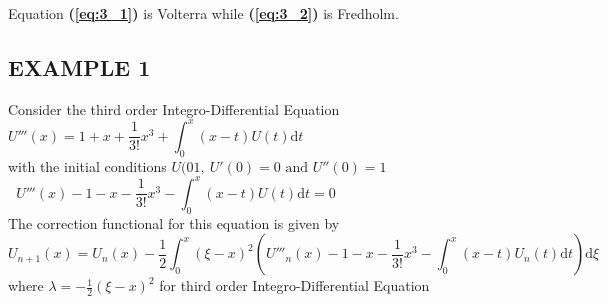 \documentclass[12pt]{report}
\newcommand{\refn}[1]{\textbf{(\ref{#1})}}
\newcommand{\NI}{\noindent}
\newcommand{\dsp}{\displaystyle}
\newcommand{\IDE}{Integro-Differential Equation}
\begin{document}
	\NI Equation \refn{eq:3_1} is Volterra while \refn{eq:3_2} is Fredholm.
	
	\subsection{EXAMPLE 1}
	Consider the third order \IDE 
	\begin{equation*}
		U'''(x) = 1 + x + \frac{1}{3!}x^3 + \int_{0}^{x}(x-t)U(t)\mbox{d}t\qquad\qquad\qquad\qquad\qquad\qquad\qquad\qquad
	\end{equation*}
	with the initial conditions $U(01,~ U'(0)=0 \text{ and } U''(0)=1$
	\begin{equation}
		U'''(x) - 1 - x - \frac{1}{3!}x^3 - \int_{0}^{x}(x-t)U(t)\mbox{d}t = 0 \qquad\qquad\qquad\qquad\qquad\qquad\label{eq:3_3}
	\end{equation}
	The correction functional for this equation is given by
	\begin{equation}
		U_{n+1}(x) = U_n(x) - \frac{1}{2}\int_0^x (\xi - x)^2 \left(U'''_n(x)-1-x-\frac{1}{3!}x^3 - \int_0^x(x-t)U_n(t)\text{d}t\right)\text{d}\xi\label{eq:3_4}
	\end{equation}
	where $\dsp\lambda = -\frac{1}{2}(\xi-x)^2$ for third order \IDE\\
	
\end{document}
